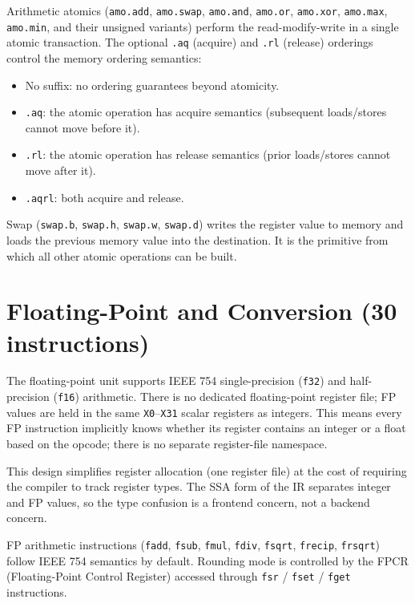 Arithmetic atomics (\texttt{amo.add}, \texttt{amo.swap}, \texttt{amo.and}, \texttt{amo.or}, \texttt{amo.xor}, \texttt{amo.max}, \texttt{amo.min}, and their unsigned variants) perform the read-modify-write in a single atomic transaction. The optional \texttt{.aq} (acquire) and \texttt{.rl} (release) orderings control the memory ordering semantics:

\begin{itemize}
  \item No suffix: no ordering guarantees beyond atomicity.
  \item \texttt{.aq}: the atomic operation has acquire semantics (subsequent loads/stores cannot move before it).
  \item \texttt{.rl}: the atomic operation has release semantics (prior loads/stores cannot move after it).
  \item \texttt{.aqrl}: both acquire and release.
\end{itemize}

Swap (\texttt{swap.b}, \texttt{swap.h}, \texttt{swap.w}, \texttt{swap.d}) writes the register value to memory and loads the previous memory value into the destination. It is the primitive from which all other atomic operations can be built.

\section{Floating-Point and Conversion (30 instructions)}
The floating-point unit supports IEEE 754 single-precision (\texttt{f32}) and half-precision (\texttt{f16}) arithmetic. There is no dedicated floating-point register file; FP values are held in the same \texttt{X0}--\texttt{X31} scalar registers as integers. This means every FP instruction implicitly knows whether its register contains an integer or a float based on the opcode; there is no separate register-file namespace.

This design simplifies register allocation (one register file) at the cost of requiring the compiler to track register types. The SSA form of the IR separates integer and FP values, so the type confusion is a frontend concern, not a backend concern.

FP arithmetic instructions (\texttt{fadd}, \texttt{fsub}, \texttt{fmul}, \texttt{fdiv}, \texttt{fsqrt}, \texttt{frecip}, \texttt{frsqrt}) follow IEEE 754 semantics by default. Rounding mode is controlled by the FPCR (Floating-Point Control Register) accessed through \texttt{fsr} / \texttt{fset} / \texttt{fget} instructions.

